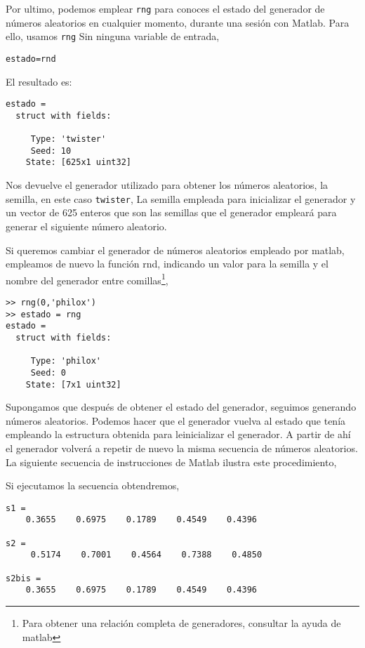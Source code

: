 Por ultimo, podemos emplear \texttt{rng} para conoces el estado del generador de números aleatorios en cualquier momento, durante una sesión con Matlab. Para ello, usamos \texttt{rng} Sin ninguna variable de entrada,
\begin{verbatim}
estado=rnd
\end{verbatim}
El resultado es:
\begin{verbatim}
estado = 
  struct with fields:

     Type: 'twister'
     Seed: 10
    State: [625x1 uint32]
\end{verbatim}
Nos devuelve el generador utilizado para obtener los números aleatorios, la semilla, en este caso \texttt{twister}, La semilla empleada para inicializar el generador y un vector de 625 enteros que son las semillas que el generador empleará para generar el siguiente número aleatorio.

Si queremos cambiar el generador de números aleatorios empleado por matlab, empleamos de nuevo la función rnd, indicando un valor para la semilla y el nombre del generador entre comillas\footnote{Para obtener una relación completa de generadores, consultar la ayuda de matlab},
\begin{verbatim}
>> rng(0,'philox')
>> estado = rng
estado = 
  struct with fields:

     Type: 'philox'
     Seed: 0
    State: [7x1 uint32]
\end{verbatim}

Supongamos que después de obtener el estado del generador, seguimos generando números aleatorios. Podemos hacer que el generador vuelva al estado que tenía empleando la estructura obtenida para leinicializar el generador. A partir de ahí el generador volverá a repetir de nuevo la misma secuencia de números aleatorios. La siguiente secuencia de instrucciones de Matlab ilustra este procedimiento,
%
%
%
%

Si ejecutamos la secuencia obtendremos,

\begin{verbatim}
s1 =
    0.3655    0.6975    0.1789    0.4549    0.4396

s2 =
     0.5174    0.7001    0.4564    0.7388    0.4850
      
s2bis =
    0.3655    0.6975    0.1789    0.4549    0.4396
\end{verbatim}

